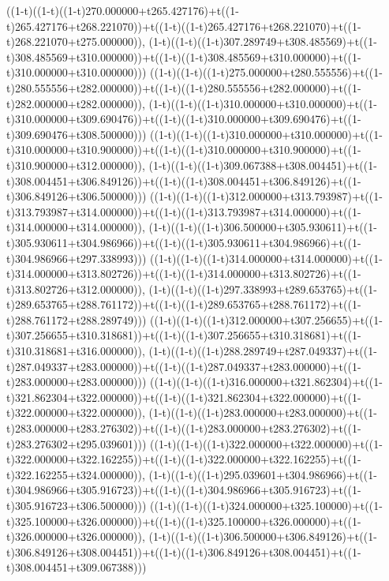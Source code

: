 ((1-t)((1-t)((1-t)270.000000+t265.427176)+t((1-t)265.427176+t268.221070))+t((1-t)((1-t)265.427176+t268.221070)+t((1-t)268.221070+t275.000000)),                                     (1-t)((1-t)((1-t)307.289749+t308.485569)+t((1-t)308.485569+t310.000000))+t((1-t)((1-t)308.485569+t310.000000)+t((1-t)310.000000+t310.000000)))
((1-t)((1-t)((1-t)275.000000+t280.555556)+t((1-t)280.555556+t282.000000))+t((1-t)((1-t)280.555556+t282.000000)+t((1-t)282.000000+t282.000000)),                                     (1-t)((1-t)((1-t)310.000000+t310.000000)+t((1-t)310.000000+t309.690476))+t((1-t)((1-t)310.000000+t309.690476)+t((1-t)309.690476+t308.500000)))
((1-t)((1-t)((1-t)310.000000+t310.000000)+t((1-t)310.000000+t310.900000))+t((1-t)((1-t)310.000000+t310.900000)+t((1-t)310.900000+t312.000000)),                                     (1-t)((1-t)((1-t)309.067388+t308.004451)+t((1-t)308.004451+t306.849126))+t((1-t)((1-t)308.004451+t306.849126)+t((1-t)306.849126+t306.500000)))
((1-t)((1-t)((1-t)312.000000+t313.793987)+t((1-t)313.793987+t314.000000))+t((1-t)((1-t)313.793987+t314.000000)+t((1-t)314.000000+t314.000000)),                                     (1-t)((1-t)((1-t)306.500000+t305.930611)+t((1-t)305.930611+t304.986966))+t((1-t)((1-t)305.930611+t304.986966)+t((1-t)304.986966+t297.338993)))
((1-t)((1-t)((1-t)314.000000+t314.000000)+t((1-t)314.000000+t313.802726))+t((1-t)((1-t)314.000000+t313.802726)+t((1-t)313.802726+t312.000000)),                                     (1-t)((1-t)((1-t)297.338993+t289.653765)+t((1-t)289.653765+t288.761172))+t((1-t)((1-t)289.653765+t288.761172)+t((1-t)288.761172+t288.289749)))
((1-t)((1-t)((1-t)312.000000+t307.256655)+t((1-t)307.256655+t310.318681))+t((1-t)((1-t)307.256655+t310.318681)+t((1-t)310.318681+t316.000000)),                                     (1-t)((1-t)((1-t)288.289749+t287.049337)+t((1-t)287.049337+t283.000000))+t((1-t)((1-t)287.049337+t283.000000)+t((1-t)283.000000+t283.000000)))
((1-t)((1-t)((1-t)316.000000+t321.862304)+t((1-t)321.862304+t322.000000))+t((1-t)((1-t)321.862304+t322.000000)+t((1-t)322.000000+t322.000000)),                                     (1-t)((1-t)((1-t)283.000000+t283.000000)+t((1-t)283.000000+t283.276302))+t((1-t)((1-t)283.000000+t283.276302)+t((1-t)283.276302+t295.039601)))
((1-t)((1-t)((1-t)322.000000+t322.000000)+t((1-t)322.000000+t322.162255))+t((1-t)((1-t)322.000000+t322.162255)+t((1-t)322.162255+t324.000000)),                                     (1-t)((1-t)((1-t)295.039601+t304.986966)+t((1-t)304.986966+t305.916723))+t((1-t)((1-t)304.986966+t305.916723)+t((1-t)305.916723+t306.500000)))
((1-t)((1-t)((1-t)324.000000+t325.100000)+t((1-t)325.100000+t326.000000))+t((1-t)((1-t)325.100000+t326.000000)+t((1-t)326.000000+t326.000000)),                                     (1-t)((1-t)((1-t)306.500000+t306.849126)+t((1-t)306.849126+t308.004451))+t((1-t)((1-t)306.849126+t308.004451)+t((1-t)308.004451+t309.067388)))
